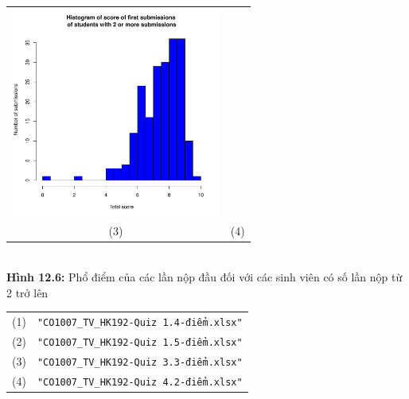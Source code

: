 \documentclass[a4paper]{article}
\theoremstyle{definition}
\begin{document}
\begin{enumerate}[a)]
\begin{itemize}
\begin{center}
\begin{tabular}{c c}
                 \includegraphics[width = 6.9cm]{Images/img12-6-4.png} \\
                 (3) & (4)
            \end{tabular}\\
            \textbf{Hình 12.6:} Phổ điểm của các lần nộp đầu đối với các sinh viên có số lần nộp từ 2 trở lên\\
            \begin{tabular}{c c}
                 (1) & \texttt{"CO1007\_TV\_HK192-Quiz 1.4-điểm.xlsx"}\\
                 (2) & \texttt{"CO1007\_TV\_HK192-Quiz 1.5-điểm.xlsx"}\\
                 (3) & \texttt{"CO1007\_TV\_HK192-Quiz 3.3-điểm.xlsx"}\\
                 (4) & \texttt{"CO1007\_TV\_HK192-Quiz 4.2-điểm.xlsx"}
            \end{tabular}
        \end{center}
        \begin{center}
            \begin{tabular}{c c}

\end{tabular}
\end{center}
\end{itemize}
\end{enumerate}
\end{document}
